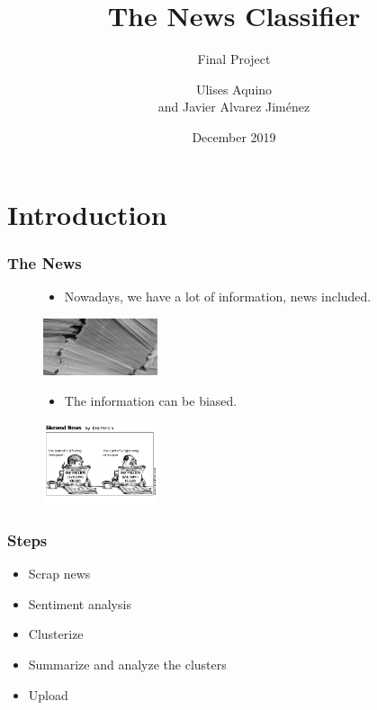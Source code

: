 \documentclass[12pt]{beamer}
\title{The News Classifier}
\subtitle{ Final Project  }
\author{Ulises Aquino  \\ and Javier Alvarez Jiménez}
\institute[IH]{IronHack \\
Mexico }
\date{December 2019}
\begin{document}
\frame{\titlepage}





\section{Introduction}

\begin{frame}

\frametitle{The News}
\begin{figure}  \label{fig:papers}
  
	\begin{itemize}
	\item Nowadays, we have a lot of information, news included.
	\end{itemize}  
  
   \includegraphics[width=0.3\textwidth]{muchpaper.jpg}
  \label{fig:papers}
\end{figure}

\begin{figure}  \label{fig:bias}
  
	\begin{itemize}
	\item The information can be biased.
	\end{itemize}  
  
   \includegraphics[width=0.3\textwidth]{bias.png}
  \label{fig:bias}
\end{figure}





\end{frame}
\begin{frame}
\frametitle{Steps}
\begin{itemize}
\item Scrap  news  \pause
\item Sentiment analysis  \pause
\item Clusterize  \pause
\item Summarize and analyze the clusters \pause
\item Upload 
\end{itemize}
\end{frame}
\end{document}
